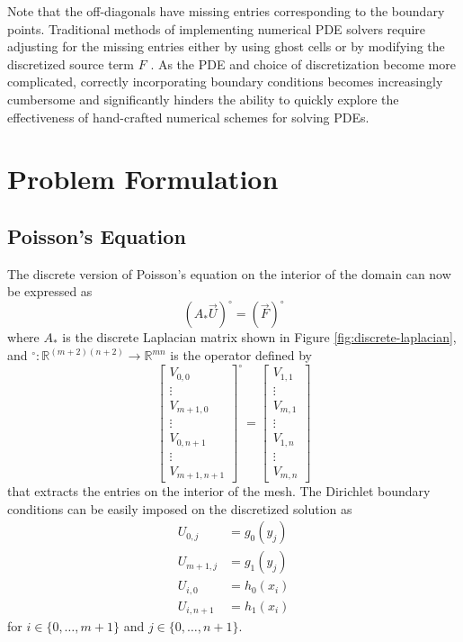 \documentclass[conference]{IEEEtran}
\begin{document}
Note that the off-diagonals have missing entries corresponding to the boundary points. Traditional methods of implementing numerical PDE solvers require adjusting for the missing entries either by using ghost cells or by modifying the discretized source term $F$ \cite{leveque2007fdm}. As the PDE and choice of discretization become more complicated, correctly incorporating boundary conditions becomes increasingly cumbersome and significantly hinders the ability to quickly explore the effectiveness of hand-crafted numerical schemes for solving PDEs.


\section{Problem Formulation}

\subsection{Poisson's Equation}

The discrete version of Poisson's equation on the interior of the domain can now be expressed as
\begin{equation}
  (A_* \vec{U})^\circ = (\vec{F})^\circ
\end{equation}
where $A_*$ is the discrete Laplacian matrix shown in Figure \ref{fig:discrete-laplacian}, and ${}^\circ : \mathbb{R}^{(m+2)(n+2)} \to \mathbb{R}^{mn}$ is the operator defined by
\begin{equation}
  \begin{bmatrix}
    V_{0,0} \\ \vdots \\ V_{m+1,0} \\ \vdots \\ V_{0,n+1} \\ \vdots \\ V_{m+1,n+1}
  \end{bmatrix}^\circ = \begin{bmatrix}
    V_{1,1} \\ \vdots \\ V_{m,1} \\ \vdots \\ V_{1,n} \\ \vdots \\ V_{m,n}
  \end{bmatrix}
\end{equation}
that extracts the entries on the interior of the mesh. The Dirichlet boundary conditions can be easily imposed on the discretized solution as
\begin{align}
  U_{0,j} &= g_0(y_j) \\
  U_{m+1,j} &= g_1(y_j) \\
  U_{i,0} &= h_0(x_i) \\
  U_{i,n+1} &= h_1(x_i)
\end{align}
for $i \in \{0,\ldots,m+1\}$ and $j \in \{0,\ldots,n+1\}$.
\end{document}
